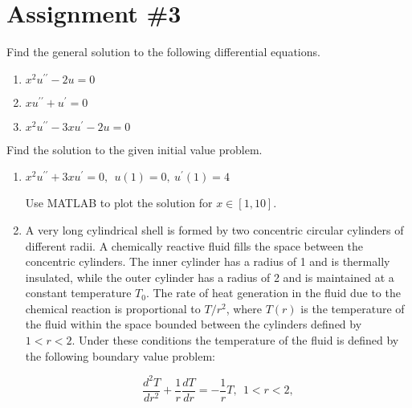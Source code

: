 \chapter{Assignment \#3}
\label{ch:ass3}
\begin{fullwidth}
\noindent Find the general solution to the following differential equations.
\begin{enumerate}
\item $x^2 u^{\prime \prime} - 2u = 0$

\vspace{1.0cm}

\item $xu^{\prime \prime} + u^{\prime} = 0$

\vspace{1.0cm}

\item $x^2 u^{\prime \prime} - 3xu^{\prime}-2u =0$

\vspace{1.0cm}

\end{enumerate}

\noindent Find the solution to the given initial value problem.

\begin{enumerate}[resume]
\item $x^2u^{\prime \prime}+3xu^{\prime} = 0, \ \ u(1) = 0, \ u^{\prime}(1)=4$

Use MATLAB to plot the solution for $x\in[1,10]$.

\vspace{1.0cm}

\item A very long cylindrical shell is formed by two concentric circular cylinders of different radii.  A chemically reactive fluid fills the space between the concentric cylinders.  The inner cylinder has a radius of 1 and is thermally insulated, while the outer cylinder has a radius of 2 and is maintained at a constant temperature $T_0$.  The rate of heat generation in the fluid due to the chemical reaction is proportional to $T/r^2$, where $T(r)$ is the temperature of the fluid within the space bounded between the cylinders defined by $1<r<2$.  Under these conditions the temperature of the fluid is defined by the following boundary value problem:

\begin{equation*}
\frac{d^2T}{dr^2}+\frac{1}{r}\frac{dT}{dr}=-\frac{1}{r}T, \ \ 1 < r < 2, 
\end{equation*}


\end{enumerate}
\end{fullwidth}
